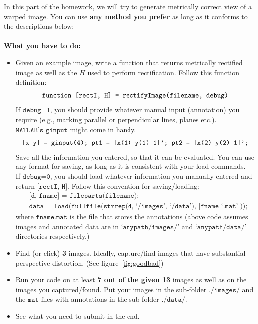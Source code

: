 \documentclass[11pt]{article}
\begin{document}
In this part of the homework, we will try to generate metrically correct view of a warped image. You can use \underline{{\bf any method you prefer}} as long as it conforms to the descriptions below:
\\
\\
{\bf What you have to do:}\vspace{-0.25in}\\
\begin{itemize}
\item Given an example image, write a function that returns metrically rectified image as well as the $H$ used to perform rectification. Follow this function definition:\vspace{-0.05in}
$$\texttt{function [rectI, H] = rectifyImage(filename, debug)}\vspace{-0.05in}$$
If $\texttt{debug=1}$, you should provide whatever manual input (annotation) you require (e.g., marking parallel or perpendicular lines, planes etc.). $\texttt{MATLAB's ginput}$ might come in handy.\vspace{-0.05in}
$$\texttt{[x y] = ginput(4); pt1 = [x(1) y(1) 1]'; pt2 = [x(2) y(2) 1]';}\vspace{-0.05in}$$
Save all the information you entered, so that it can be evaluated. You can use any format for saving, as long as it is consistent with your load commands. \\
If $\texttt{debug=0}$, you should load whatever information you manually entered and return $\texttt{[rectI, H]}$. Follow this convention for saving/loading:\vspace{-0.05in}
\begin{align*}
&\texttt{[d, fname] = fileparts(filename);}\\
&\texttt{data = load(fullfile(strrep(d, `/images', `/data'), [fname `.mat']));}
\end{align*}
where $\texttt{fname.mat}$ is the file that stores the annotations (above code assumes images and annotated data are in $\texttt{`anypath/images/'}$ and $\texttt{`anypath/data/'}$ directories respectively.)
\item Find (or click) {\bf 3} images. Ideally, capture/find images that have substantial perspective distortion. (See figure~\ref{fig:goodbad})
\item Run your code on at least {\bf 7 out of the given 13} images as well as on the images you captured/found. Put your images in the sub-folder $\texttt{./images/}$ and the $\texttt{mat}$ files with annotations in the sub-folder $\texttt{./data/}$.
\item See what you need to submit in the end.
\end{itemize}
\end{document}
